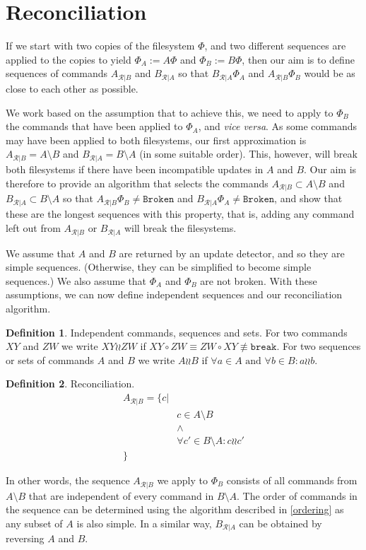 \documentclass[12pt]{article}
\newcommand{\fsbroken}{\mathtt{Broken}} %
\newcommand{\FS}{\Phi} %
\newcommand{\cbrk}{\mathtt{break}} %
\newcommand{\fscommand}[2]{{#1#2}}
\newcommand{\cxy}{\fscommand{X}{Y}}
\newcommand{\czw}{\fscommand{Z}{W}}
\newcommand{\cc}{\circ} %
\newcommand{\nequiv}{\not\equiv}
\newcommand{\indep}{\mathrel{\wr\wr}} %
\newcommand{\recchar}[3]{{#1}^{#3}_{\mathcal{R}|{#2}}}
\newcommand{\reca}{\recchar{A}{B}{}} %
\newcommand{\recb}{\recchar{B}{A}{}} %
\theoremstyle{definition}
\newtheorem{mydef}{Definition}
\begin{document}
\section{Reconciliation}

If we start with two copies of the filesystem $\FS$,
and two different sequences are applied to the copies to yield $\FS_A:=A\FS$
and $\FS_B:=B\FS$, then our aim is to define sequences of commands $\reca$ and $\recb$
so that $\recb\FS_A$ and $\reca\FS_B$ would be as close to each other as possible.

We work based on the assumption that to achieve this, we need
to apply to $\FS_B$ the commands that have been applied to $\FS_A$, and \emph{vice versa}.
As some commands may have been applied to both filesystems, our first approximation
is $\reca = A\setminus B$ and $\recb = B\setminus A$
(in some suitable order).
This, however, will break both filesystems if there have been incompatible updates
in $A$ and $B$. 
Our aim is therefore to provide an algorithm that selects the commands 
$\reca \subset A\setminus B$
and $\recb \subset B\setminus A$ 
so that $\reca\FS_B\neq\fsbroken$ and $\recb\FS_A\neq\fsbroken$,
and show that these are the longest sequences with this property, that is,
adding any command left out from $\reca$ or $\recb$ will break the filesystems.

We assume that $A$ and $B$ are returned by an update detector,
and so they are simple sequences.
(Otherwise, they can be simplified to become simple sequences.)
We also assume that $\FS_A$ and $\FS_B$ are not broken.
With these assumptions,
we can now define independent sequences and
our reconciliation algorithm.

\begin{mydef}{Independent commands, sequences and sets.}
For two commands $\cxy$ and $\czw$ we write $\cxy\indep\czw$ if $\cxy\cc \czw\equiv\czw\cc \cxy\nequiv\cbrk$.
For two sequences or sets of commands $A$ and $B$ we write $A\indep B$ if
$\forall a\in A \mbox{~and~} \forall b\in B: a\indep b$.
\end{mydef}

\begin{mydef}{Reconciliation.}\label{def:reconciliation}
\begin{align*}
\reca = \{c| & \\
& c\in A\setminus B \\
& \wedge \\
& \forall c'\in B\setminus A: c\indep c'\\
\} &
\end{align*}

In other words, the sequence $\reca$ we apply to $\FS_B$ consists of all commands from $A\setminus B$
that are independent of every command in $B\setminus A$.
The order of commands in the sequence can be determined using the algorithm described in
\cref{ordering} as any subset of $A$ is also simple.
In a similar way, $\recb$ can be obtained by reversing $A$ and $B$.
\end{mydef}
\end{document}
